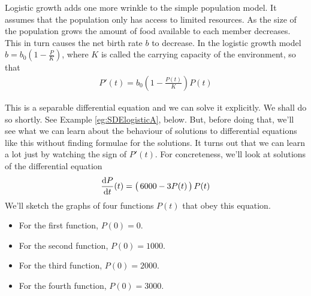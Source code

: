 Logistic growth adds one more wrinkle to the simple population model.
It assumes that the
population only has access to limited resources. As the size of the population
grows the amount of food available to each member decreases. This in turn
causes the net birth rate $b$ to decrease. In the logistic growth model
$b=b_0\left(1-\tfrac{P}{K}\right)$, where $K$ is called the carrying capacity
of the environment,  so that
\begin{align*}
  P'(t) =b_0\left(1-\frac{P(t)}{K}\right)P(t)
\end{align*}

This is a separable differential equation and we can solve it explicitly.
We shall do so shortly. See Example \ref{eg:SDElogisticA}, below.
But, before doing that, we'll see what we can learn about the behaviour
of solutions to differential equations like this without finding
formulae for the solutions. It turns out that we can learn a lot
just by watching the sign of $P'(t)$. For concreteness,
we'll look at solutions of the differential equation
\begin{align*}
  \diff{P}{t}(t)=\big(\,6000-3P(t)\,\big)\,P(t)
\end{align*}
We'll sketch the graphs of four functions $P(t)$ that obey this equation.
\begin{itemize} \itemsep1pt \parskip0pt
  \item    For the first function, $P(0)=0$.
  \item    For the second function, $P(0)=1000$.
  \item    For the third function, $P(0)=2000$.
  \item    For the fourth function, $P(0)=3000$.
\end{itemize}

